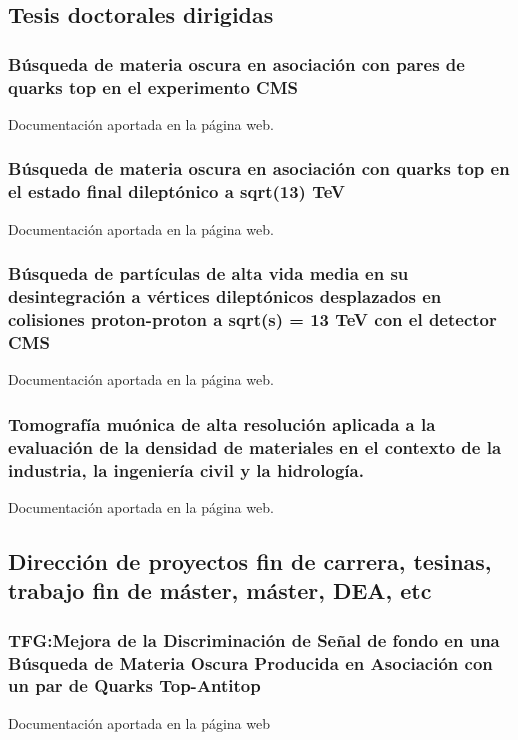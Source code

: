 \documentclass[a4paper, 11pt, twoside, openright]{report}
\begin{document}
\subsection{Tesis doctorales dirigidas}


\subsubsection{Búsqueda de materia oscura en asociación con pares de quarks top en el experimento CMS}
%
Documentación aportada en la página web.
\subsubsection{Búsqueda de materia oscura en asociación con quarks top en el estado final dileptónico a sqrt(13) TeV}
%
Documentación aportada en la página web.
\subsubsection{Búsqueda de partículas de alta vida media en su desintegración a vértices dileptónicos desplazados en colisiones proton-proton a sqrt(s) = 13 TeV con el detector CMS}
%
Documentación aportada en la página web.
\subsubsection{Tomografía muónica de alta resolución aplicada a la evaluación de la densidad de materiales en el contexto de la industria, la ingeniería civil y la hidrología.}
%
Documentación aportada en la página web.




\subsection{Dirección de proyectos fin de carrera, tesinas, trabajo fin de máster, máster, DEA, etc}

\subsubsection{TFG:Mejora de la Discriminación de Señal de fondo en una Búsqueda de Materia Oscura Producida en Asociación con un par de Quarks Top-Antitop}
Documentación aportada en la página web
\end{document}
